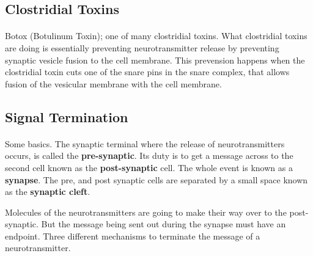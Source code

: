 \documentclass[12pt, a4paper]{article}
\begin{document}
\subsection{Clostridial Toxins}
\paragraph*{}
Botox (Botulinum Toxin); one of many clostridial toxins. What clostridial toxins are doing 
is essentially preventing neurotransmitter release by preventing synaptic vesicle 
fusion to the cell membrane. This prevension happens when the clostridial toxin cuts one of the snare pins in the
snare complex, that allows fusion of the vesicular membrane with the cell membrane.


\subsection{Signal Termination}
\paragraph*{}
Some basics. The synaptic terminal where the release of neurotransmitters occurs, is called
the \textbf{pre-synaptic}. Its duty is to get a message across to the second cell known as the
\textbf{post-synaptic} cell. The whole event is known as a \textbf{synapse}. The pre, and post synaptic cells are 
separated by a small space known as the \textbf{synaptic cleft}.

Molecules of the neurotransmitters are going to make their way over to the post-synaptic.
But the message being sent out during the synapse must have an endpoint. Three different mechanisms
to terminate the message of a neurotransmitter.
\end{document}
